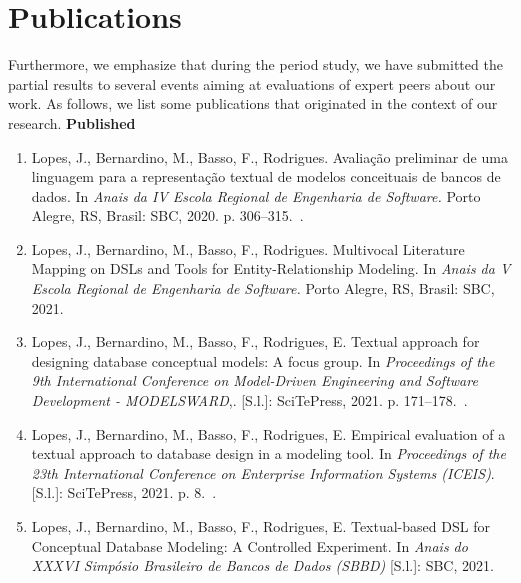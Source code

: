 \section{Publications}

Furthermore, we emphasize that during the period study, we have submitted the partial results to several events aiming at evaluations of expert peers about our work.
As follows, we list some publications that originated in the context of our research.
\linebreak 
\linebreak
\textbf{Published} 
    \begin{enumerate}[label=\roman*.]
        \item Lopes, J., Bernardino, M., Basso, F., Rodrigues. Avaliação preliminar de uma linguagem para a representação textual de modelos conceituais de bancos de dados. In \textit{Anais da IV Escola Regional de Engenharia de Software.} Porto Alegre, RS, Brasil: SBC, 2020. p. 306–315.~\cite{eres}. 
        \item Lopes, J., Bernardino, M., Basso, F., Rodrigues. Multivocal Literature Mapping on DSLs and Tools for Entity-Relationship Modeling. In \textit{Anais da V Escola Regional de Engenharia de Software.} Porto Alegre, RS, Brasil: SBC, 2021.~\cite{eres:2021}
        \item Lopes, J., Bernardino, M., Basso, F., Rodrigues, E. Textual approach for designing database conceptual models: A focus group. In \textit{Proceedings of the 9th International Conference on Model-Driven Engineering and Software Development - MODELSWARD},. [S.l.]: SciTePress, 2021. p. 171–178.~\cite{modelsward21}. 
        \item Lopes, J., Bernardino, M., Basso, F., Rodrigues, E. Empirical evaluation of a textual approach to database design in a modeling tool. In \textit{Proceedings of the 23th International Conference on Enterprise Information Systems (ICEIS)}. [S.l.]: SciTePress, 2021. p. 8.~\cite{iceis21}. 
        \item Lopes, J., Bernardino, M., Basso, F., Rodrigues, E. Textual-based DSL for Conceptual Database Modeling: A Controlled Experiment. In \textit{Anais do XXXVI Simpósio Brasileiro de Bancos de Dados (SBBD)} [S.l.]: SBC, 2021.~\cite{sbbd:2021}
    \end{enumerate} 

